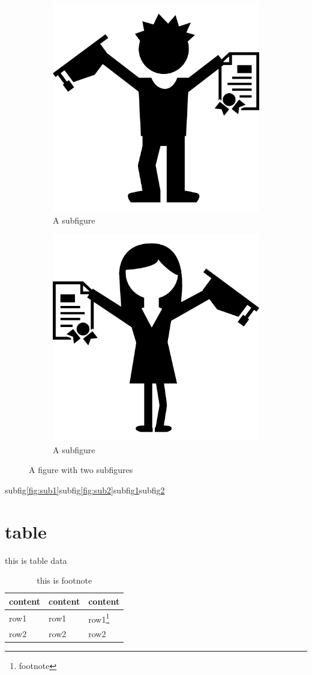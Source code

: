 \documentclass[
    writingLanguage=english, 
    addPageTitle=on,
    addDeclaration=on,
    addMUSTlog=off,
    printing=off,
    refIndent=on,
    addFigTOC=on,
    addTabTOC=on,
]{.def/must}
\begin{document}
\begin{figure}[H]
	\begin{subfigure}{.49\textwidth}
		\centering
		\includegraphics[width=.5\linewidth]{.def/.resource/eg05.png}
		\caption{A subfigure}
		\label{fig:sub3}
	\end{subfigure}
	\begin{subfigure}{.49\textwidth}
		\centering
		\includegraphics[width=.5\linewidth]{.def/.resource/eg06.png}
		\caption{A subfigure}
		\label{fig:sub4}
	\end{subfigure}
	\caption{A figure with two subfigures}
	\label{fig:sub}
\end{figure}
 
subfig\ref{fig:sub1}subfig\ref{fig:sub2}subfig\ref{fig:sub3}subfig\ref{fig:sub4}



\section{table}

\captionsetup[table]{singlelinecheck=off,justification=raggedright}
\begin{table}
\caption{this is table data}
\centering
\begin{tabularx}{\textwidth}{XXX} %
\toprule
content & content & content \\
\midrule
row1 & row1 & row1\footnote{footnote} \\
row2 & row2 & row2 \\
\bottomrule
\end{tabularx}
\caption*{this is footnote}
\end{table}
\end{document}
